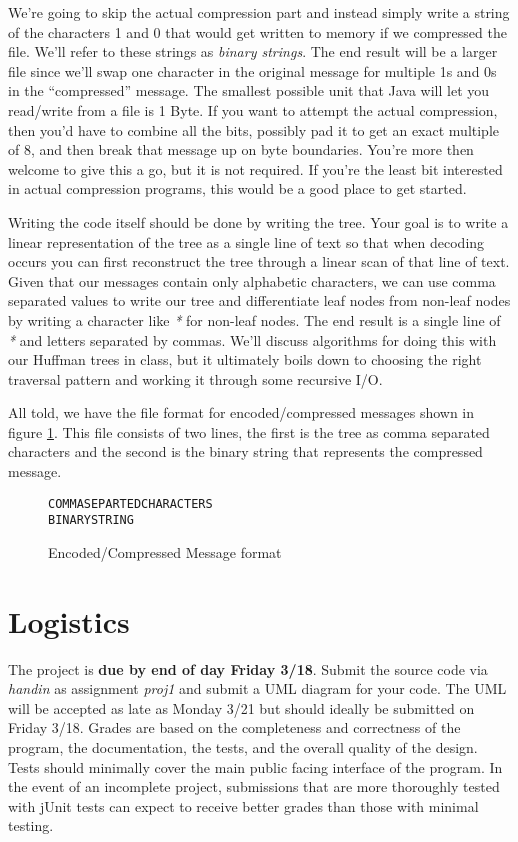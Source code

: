 \documentclass[]{tufte-handout}
\begin{document}
We're going to skip the actual compression part and instead simply write a string of the characters 1 and 0 that would get written to memory if we compressed the file. We'll refer to these strings as \textit{binary strings}. The end result will be a larger file since we'll swap one character in the original message for multiple 1s and 0s in the ``compressed'' message. The smallest possible unit that Java will let you read/write from a file is 1 Byte. If you want to attempt the actual compression, then you'd have to combine all the bits, possibly pad it to get an exact multiple of 8, and then break that message up on byte boundaries. You're more then welcome to give this a go, but it is not required. If you're the least bit interested in actual compression programs, this would be a good place to get started.   

Writing the code itself should be done by writing the tree. Your goal is to write a linear representation of the tree as a single line of text so that when decoding occurs you can first reconstruct the tree through a linear scan of that line of text. Given that our messages contain only alphabetic characters, we can use comma separated values to write our tree and differentiate leaf nodes from non-leaf nodes by writing a character like \textit{*} for non-leaf nodes. The end result is a single line of \textit{*} and letters separated by commas. We'll discuss algorithms for doing this with our Huffman trees in class, but it ultimately boils down to choosing the right traversal pattern and working it through some recursive I/O.  

All told, we have the file format for encoded/compressed messages shown in figure \ref{fig:encodefile}. This file consists of two lines, the first is the tree as comma separated characters and the second is the binary string that represents the compressed message. 

\begin{figure}
\begin{verbatim}
COMMASEPARTEDCHARACTERS
BINARYSTRING
\end{verbatim}
\caption{Encoded/Compressed Message format}
\label{fig:encodefile}
\end{figure}

\section{Logistics}

The project is \textbf{due by end of day Friday 3/18}. Submit the source code via \textit{handin} as assignment \textit{proj1} and submit a UML diagram for your code. The UML will be accepted as late as Monday 3/21 but should ideally be submitted on Friday 3/18.   Grades are based on the completeness and correctness of the program, the documentation, the tests, and the overall quality of the design. Tests should minimally cover the main public facing interface of the program. In the event of an incomplete project, submissions that are more thoroughly tested with jUnit tests can expect to receive better grades than those with minimal testing. 
\end{document}

